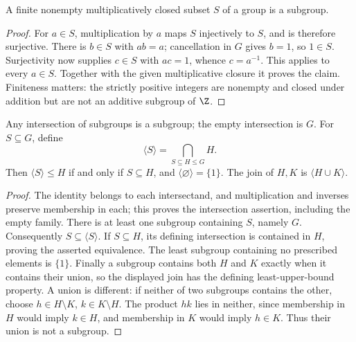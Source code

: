 \begin{proposition}\label{prop:finite-subgroup-test}
A finite nonempty multiplicatively closed subset $S$ of a group is a subgroup.
\end{proposition}
\begin{proof}
For $a\in S$, multiplication by $a$ maps $S$ injectively to $S$, and is therefore surjective. There is $b\in S$ with $ab=a$; cancellation in $G$ gives $b=1$, so $1\in S$. Surjectivity now supplies $c\in S$ with $ac=1$, whence $c=a^{-1}$. This applies to every $a\in S$. Together with the given multiplicative closure it proves the claim. Finiteness matters: the strictly positive integers are nonempty and closed under addition but are not an additive subgroup of $\Z$.
\end{proof}

\begin{proposition}\label{prop:generated-minimal}
Any intersection of subgroups is a subgroup; the empty intersection is $G$. For $S\subseteq G$, define
\[
 \langle S\rangle=\bigcap_{S\subseteq H\leq G}H.
\]
Then $\langle S\rangle\leq H$ if and only if $S\subseteq H$, and $\langle\varnothing\rangle=\{1\}$. The join of $H,K$ is $\langle H\cup K\rangle$.
\end{proposition}
\begin{proof}
The identity belongs to each intersectand, and multiplication and inverses preserve membership in each; this proves the intersection assertion, including the empty family. There is at least one subgroup containing $S$, namely $G$. Consequently $S\subseteq\langle S\rangle$. If $S\subseteq H$, its defining intersection is contained in $H$, proving the asserted equivalence. The least subgroup containing no prescribed elements is $\{1\}$. Finally a subgroup contains both $H$ and $K$ exactly when it contains their union, so the displayed join has the defining least-upper-bound property. A union is different: if neither of two subgroups contains the other, choose $h\in H\setminus K$, $k\in K\setminus H$. The product $hk$ lies in neither, since membership in $H$ would imply $k\in H$, and membership in $K$ would imply $h\in K$. Thus their union is not a subgroup.
\end{proof}

